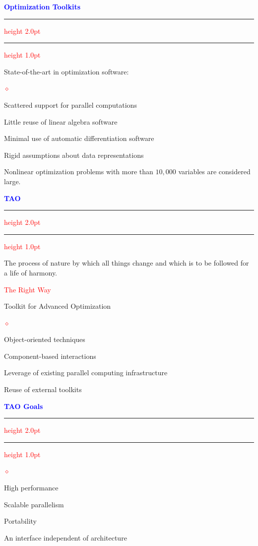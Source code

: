 \documentclass{seminar}
\newcommand{\reddiamond}{\textcolor{red}{$\diamond$}}
\newcommand{\redstripe}{\textcolor{red}{\hrule height 2.0pt\hfil}
             \vspace{-1.8pt}
             \textcolor{red}{\hrule height 1.0pt\hfil}
}
\newcommand{\heading}[1]{%
   \centerline{\textcolor{blue}{\textbf{#1}}}%
    \redstripe%
    \bigskip
}
\begin{document}
\begin{slide}

\heading{Optimization Toolkits}

State-of-the-art in optimization software:

\begin{list}{\reddiamond}{}
\item
Scattered support for parallel computations
\item
Little reuse of linear algebra software
\item
Minimal use of automatic differentiation software
\item
Rigid assumptions about data representations
\item
Nonlinear optimization problems with more than $ 10, 000 $
variables are considered large.
\end{list}

\vfill

\end{slide}

\begin{slide}

\heading{TAO}

The process of nature by which all things change
and which is to be followed for a life of harmony.

\bigskip

\begin{center}
\textcolor{red}{The Right Way}
\end{center}

\bigskip

Toolkit for Advanced Optimization

\begin{list}{\reddiamond}{}
\item
Object-oriented techniques
\item
Component-based interactions
\item
Leverage of existing parallel computing infrastructure
\item
Reuse of external toolkits
\end{list}

\vfill

\end{slide}

\begin{slide}

\heading{TAO Goals}

\begin{list}{\reddiamond}{}
\item
High performance
\item
Scalable parallelism
\item
Portability
\item
An interface independent of architecture
\end{list}

\vfill

\end{slide}
\end{document}
